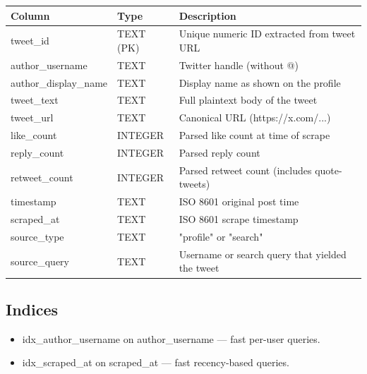 \documentclass[11pt, a4paper]{article}
\def\texttt#1{#1}%
\begin{document}
\begin{center}
\begin{tabularx}{\linewidth}{llX}
\toprule
\textbf{Column}            & \textbf{Type}    & \textbf{Description} \\
\midrule
\texttt{tweet\_id}         & TEXT (PK)        & Unique numeric ID extracted from tweet URL \\
\texttt{author\_username}  & TEXT             & Twitter handle (without \texttt{@}) \\
\texttt{author\_display\_name} & TEXT         & Display name as shown on the profile \\
\texttt{tweet\_text}       & TEXT             & Full plaintext body of the tweet \\
\texttt{tweet\_url}        & TEXT             & Canonical URL (\texttt{https://x.com/...}) \\
\texttt{like\_count}       & INTEGER          & Parsed like count at time of scrape \\
\texttt{reply\_count}      & INTEGER          & Parsed reply count \\
\texttt{retweet\_count}    & INTEGER          & Parsed retweet count (includes quote-tweets) \\
\texttt{timestamp}         & TEXT             & ISO 8601 original post time \\
\texttt{scraped\_at}       & TEXT             & ISO 8601 scrape timestamp \\
\texttt{source\_type}      & TEXT             & \texttt{"profile"} or \texttt{"search"} \\
\texttt{source\_query}     & TEXT             & Username or search query that yielded the tweet \\
\bottomrule
\end{tabularx}
\end{center}

\subsection{Indices}

\begin{itemize}[leftmargin=1.6em]
  \item \texttt{idx\_author\_username} on \texttt{author\_username} --- fast per-user queries.
  \item \texttt{idx\_scraped\_at} on \texttt{scraped\_at} --- fast recency-based queries.
\end{itemize}
\newpage
\end{document}
